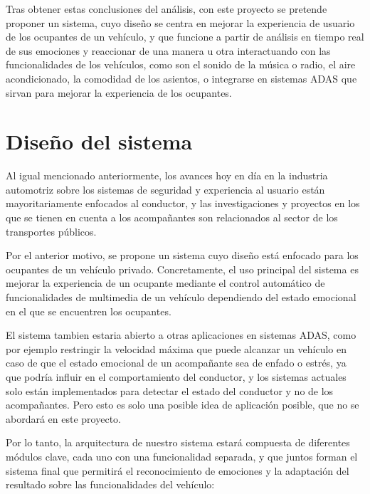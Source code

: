 \documentclass[12pt]{report} %
\begin{document}
Tras obtener estas conclusiones del análisis, con este proyecto se pretende proponer un sistema, cuyo diseño se centra en mejorar la experiencia de usuario de los ocupantes de un vehículo, y que funcione a partir de análisis en tiempo real de sus emociones y reaccionar de una manera u otra interactuando con las funcionalidades de los vehículos, como son el sonido de la música o radio, el aire acondicionado, la comodidad de los asientos, o integrarse en sistemas ADAS que sirvan para mejorar la experiencia de los ocupantes.



\chapter{Diseño del sistema}

Al igual mencionado anteriormente, los avances hoy en día en la industria automotriz sobre los sistemas de seguridad y experiencia al usuario están mayoritariamente enfocados al conductor, y las investigaciones y proyectos en los que se tienen en cuenta a los acompañantes son relacionados al sector de los transportes públicos. 

Por el anterior motivo, se propone un sistema cuyo diseño está enfocado para los ocupantes de un vehículo privado. Concretamente, el uso principal del sistema es mejorar la experiencia de un ocupante mediante el control automático de funcionalidades de multimedia de un vehículo dependiendo del estado emocional en el que se encuentren los ocupantes.

El sistema tambien estaria abierto a otras aplicaciones en sistemas ADAS, como por ejemplo restringir la velocidad máxima que puede alcanzar un vehículo en caso de que el estado emocional de un acompañante sea de enfado o estrés, ya que podría influir en el comportamiento del conductor, y los sistemas actuales solo están implementados para detectar el estado del conductor y no de los acompañantes. Pero esto es solo una posible idea de aplicación posible, que no se abordará en este proyecto. 

Por lo tanto, la arquitectura de nuestro sistema estará compuesta de diferentes módulos clave, cada uno con una funcionalidad separada, y que juntos forman el sistema final que permitirá el reconocimiento de emociones y la adaptación del resultado sobre las funcionalidades del vehículo:
\end{document}
